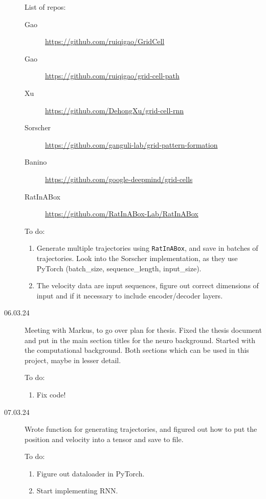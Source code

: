 \begin{description}
    List of repos:
    \begin{description}
        \item[Gao]  \url{https://github.com/ruiqigao/GridCell}
        \item[Gao] \url{https://github.com/ruiqigao/grid-cell-path}
        \item[Xu] \url{https://github.com/DehongXu/grid-cell-rnn}
        \item[Sorscher] \url{https://github.com/ganguli-lab/grid-pattern-formation}
        \item[Banino] \url{https://github.com/google-deepmind/grid-cells}
        \item[RatInABox] \url{https://github.com/RatInABox-Lab/RatInABox}
    \end{description}
    
    To do:
    \begin{enumerate}
        \item Generate multiple trajectories using \verb|RatInABox|, and save in batches of trajectories. Look into the Sorscher implementation, as they use PyTorch (batch\_size, sequence\_length, input\_size). 
        \item The velocity data are input sequences, figure out correct dimensions of input and if it necessary to include encoder/decoder layers.
    \end{enumerate}

    \item[06.03.24] Meeting with Markus, to go over plan for thesis. Fixed the thesis document and put in the main section titles for the neuro background. Started with the computational background. Both sections which can be used in this project, maybe in lesser detail.

    To do: %
    \begin{enumerate}
        \item Fix code!
    \end{enumerate}

    \item[07.03.24] Wrote function for generating trajectories, and figured out how to put the position and velocity into a tensor and save to file.

    To do: %
    \begin{enumerate}
        \item Figure out dataloader in PyTorch.
        \item Start implementing RNN.
    \end{enumerate}


\end{description}
